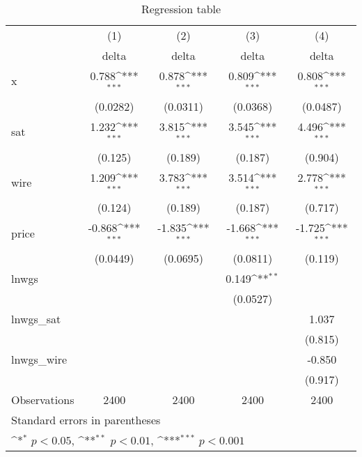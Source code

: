 \begin{table}[htbp]\centering
\def\sym#1{\ifmmode^{#1}\else\(^{#1}\)\fi}
\caption{Regression table\label{tab1}}
\begin{tabular}{l*{4}{c}}
\hline\hline
                    &\multicolumn{1}{c}{(1)}&\multicolumn{1}{c}{(2)}&\multicolumn{1}{c}{(3)}&\multicolumn{1}{c}{(4)}\\
                    &\multicolumn{1}{c}{delta}&\multicolumn{1}{c}{delta}&\multicolumn{1}{c}{delta}&\multicolumn{1}{c}{delta}\\
\hline
x                   &       0.788\sym{***}&       0.878\sym{***}&       0.809\sym{***}&       0.808\sym{***}\\
                    &    (0.0282)         &    (0.0311)         &    (0.0368)         &    (0.0487)         \\
[1em]
sat                 &       1.232\sym{***}&       3.815\sym{***}&       3.545\sym{***}&       4.496\sym{***}\\
                    &     (0.125)         &     (0.189)         &     (0.187)         &     (0.904)         \\
[1em]
wire                &       1.209\sym{***}&       3.783\sym{***}&       3.514\sym{***}&       2.778\sym{***}\\
                    &     (0.124)         &     (0.189)         &     (0.187)         &     (0.717)         \\
[1em]
price               &      -0.868\sym{***}&      -1.835\sym{***}&      -1.668\sym{***}&      -1.725\sym{***}\\
                    &    (0.0449)         &    (0.0695)         &    (0.0811)         &     (0.119)         \\
[1em]
lnwgs               &                     &                     &       0.149\sym{**} &                     \\
                    &                     &                     &    (0.0527)         &                     \\
[1em]
lnwgs\_sat           &                     &                     &                     &       1.037         \\
                    &                     &                     &                     &     (0.815)         \\
[1em]
lnwgs\_wire          &                     &                     &                     &      -0.850         \\
                    &                     &                     &                     &     (0.917)         \\
\hline
Observations        &        2400         &        2400         &        2400         &        2400         \\
\hline\hline
\multicolumn{5}{l}{\footnotesize Standard errors in parentheses}\\
\multicolumn{5}{l}{\footnotesize \sym{*} \(p<0.05\), \sym{**} \(p<0.01\), \sym{***} \(p<0.001\)}\\
\end{tabular}
\end{table}
